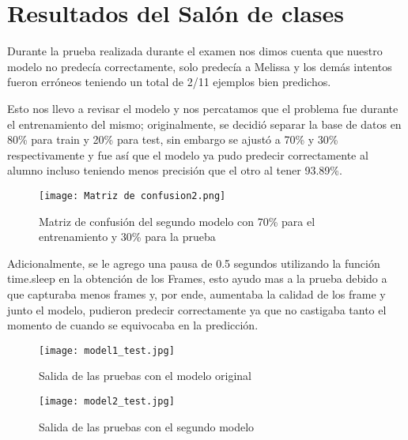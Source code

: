 \documentclass[12pt, letterpaper]{article}
\begin{document}
\section{Resultados del Salón de clases}
Durante la prueba realizada durante el examen nos dimos cuenta que nuestro modelo no predecía correctamente, solo predecía a Melissa y los demás intentos fueron erróneos teniendo un total de 2/11 ejemplos bien predichos.\par 
Esto nos llevo a revisar el modelo y nos percatamos que el problema fue durante el entrenamiento del mismo; originalmente, se decidió separar la base de datos en 80\% para train y 20\% para test, sin embargo se ajustó a 70\% y 30\% respectivamente  y fue así que el modelo ya pudo predecir correctamente al alumno incluso teniendo menos precisión  que el otro al tener 93.89\%.\par 
\begin{figure}[H]
    \centering
    \texttt{[image: Matriz de confusion2.png]} 
    \caption{Matriz de confusión del segundo modelo con 70\% para el entrenamiento y 30\% para la prueba}
    \label{fig:etiqueta}
\end{figure}
Adicionalmente, se le agrego una pausa de 0.5 segundos utilizando la función time.sleep en la obtención de los Frames, esto ayudo mas a la prueba debido a que capturaba menos frames y, por ende, aumentaba la calidad de los frame y junto el modelo, pudieron predecir correctamente ya que no castigaba tanto el momento de cuando se equivocaba en la predicción.\par 
\begin{figure}[H]
    \centering
    \texttt{[image: model1\_test.jpg]} 
    \caption{Salida de las pruebas con el modelo original}
    \label{fig:etiqueta}
\end{figure}
\begin{figure}[H]
    \centering
    \texttt{[image: model2\_test.jpg]} 
    \caption{Salida de las pruebas con el segundo modelo}
    \label{fig:etiqueta}
\end{figure}
\end{document}
